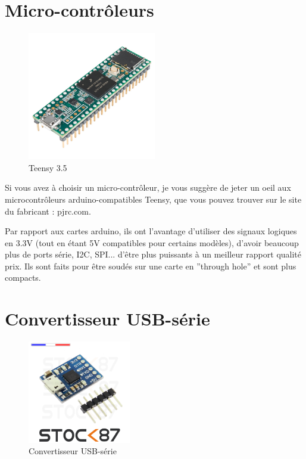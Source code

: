 \documentclass[a4paper, 11pt]{report}
\begin{document}
\section{Micro-contrôleurs}

\begin{figure}[h]
\caption{Teensy 3.5}

\centering{}\includegraphics[width=0.5\textwidth]{images/teensy_3_5.jpg}
\end{figure}

Si vous avez à choisir un micro-contrôleur, je vous suggère de jeter
un oeil aux microcontrôleurs arduino-compatibles Teensy, que vous
pouvez trouver sur le site du fabricant : pjrc.com.

Par rapport aux cartes arduino, ils ont l'avantage d'utiliser des
signaux logiques en 3.3V (tout en étant 5V compatibles pour certains
modèles), d'avoir beaucoup plus de ports série, I2C, SPI... d'être
plus puissants à un meilleur rapport qualité prix. Ils sont faits
pour être soudés sur une carte en ''through hole'' et sont plus
compacts.

\section{Convertisseur USB-série}

\begin{figure}[h]
\caption{Convertisseur USB-série}

\centering{}\includegraphics[width=0.4\textwidth]{images/usb_serie.png}
\end{figure}
\end{document}

